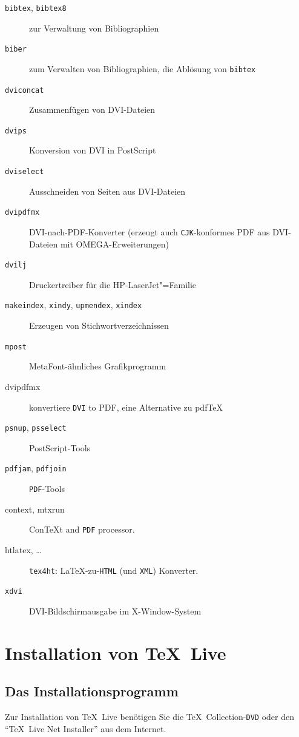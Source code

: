 \documentclass[12pt,ngerman,a4paper,fullparskip]{report}
\newcommand{\TL}{\TeX\ Live\xspace}
\newcommand{\acro}[1]{\texttt{#1}}
\newcommand{\cmdname}[1]{\texttt{#1}}
\def\TK{\TeX\ Collection}
\def\MF{MetaFont}
\providecommand*{\DVD}{\acro{DVD}\xspace}
\providecommand*{\PS}{Post\-Script\xspace}
\providecommand*{\dvi}{\acro{DVI}\xspace}
\begin{document}
\begin{description}
\item[\cmdname{bibtex}, \cmdname{bibtex8}]  zur Verwaltung von Bibliographien                  
\item[\cmdname{biber}] zum Verwalten von Bibliographien, die Ablösung von \cmdname{bibtex}
\item[\cmdname{dviconcat}]      Zusammenfügen von DVI-Dateien                 
\item[\cmdname{dvips}]          Konversion von DVI in {\PS}     
\item[\cmdname{dviselect}]     Ausschneiden von Seiten aus DVI-Dateien       
\item[\cmdname{dvipdfmx}]       DVI-nach-PDF-Konverter (erzeugt auch \acro{CJK}-konformes PDF aus
DVI-Dateien mit OMEGA-Erweiterungen)
\item[\cmdname{dvilj}]          Druckertreiber für die HP-LaserJet"=Familie    
\item[\cmdname{makeindex}, \cmdname{xindy}, \cmdname{upmendex}, \cmdname{xindex}] Erzeugen von Stichwortverzeichnissen
\item[\cmdname{mpost}]          \MF-ähnliches Grafikprogramm  
\item[dvipdfmx] konvertiere \dvi{} to PDF, eine Alternative zu pdf\TeX\
\item[\cmdname{psnup}, \cmdname{psselect}]          \PS-Tools
\item[\cmdname{pdfjam}, \cmdname{pdfjoin}]          \acro{PDF}-Tools
\item [context, mtxrun] Con\TeX{}t and \acro{PDF} processor.
\item [htlatex, \ldots] \cmdname{tex4ht}: \LaTeX{}-zu-\acro{HTML} (und 
\acro{XML}) Konverter.
\item[\cmdname{xdvi}]           DVI-Bildschirmausgabe im X-Window-System      
\end{description}


\chapter{Installation von \TL}\label{sec:install}

\section{Das Installationsprogramm}\label{sec:inst-start}

Zur Installation von \TL benötigen Sie die \TK-\DVD oder den \enquote{\TL{} Net Installer} aus dem Internet.
\end{document}
